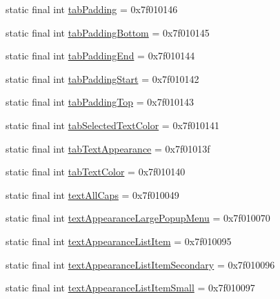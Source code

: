 \begin{CompactItemize}
static final int \hyperlink{classandroid_1_1support_1_1graphics_1_1drawable_1_1_r_1_1attr_b090fa56e3aa97223f82dd1d9bc88b09}{tabPadding} = 0x7f010146
\item 
static final int \hyperlink{classandroid_1_1support_1_1graphics_1_1drawable_1_1_r_1_1attr_11d23bd1271346ec959016307c0eb4e8}{tabPaddingBottom} = 0x7f010145
\item 
static final int \hyperlink{classandroid_1_1support_1_1graphics_1_1drawable_1_1_r_1_1attr_253a76b0998736685826b3d7fd90af44}{tabPaddingEnd} = 0x7f010144
\item 
static final int \hyperlink{classandroid_1_1support_1_1graphics_1_1drawable_1_1_r_1_1attr_38b04f93c4574faab9907e58d54379f6}{tabPaddingStart} = 0x7f010142
\item 
static final int \hyperlink{classandroid_1_1support_1_1graphics_1_1drawable_1_1_r_1_1attr_848f0f790a22eb9d114525981326c7cb}{tabPaddingTop} = 0x7f010143
\item 
static final int \hyperlink{classandroid_1_1support_1_1graphics_1_1drawable_1_1_r_1_1attr_baa9a876b28599cd8844d65e13a499f4}{tabSelectedTextColor} = 0x7f010141
\item 
static final int \hyperlink{classandroid_1_1support_1_1graphics_1_1drawable_1_1_r_1_1attr_bf138a6eb2a9141e79a42c48b279febc}{tabTextAppearance} = 0x7f01013f
\item 
static final int \hyperlink{classandroid_1_1support_1_1graphics_1_1drawable_1_1_r_1_1attr_a185f4a966938ffbfed8d23a65c412ba}{tabTextColor} = 0x7f010140
\item 
static final int \hyperlink{classandroid_1_1support_1_1graphics_1_1drawable_1_1_r_1_1attr_36a7d71fd8e60a097e4409fb0d99b5ae}{textAllCaps} = 0x7f010049
\item 
static final int \hyperlink{classandroid_1_1support_1_1graphics_1_1drawable_1_1_r_1_1attr_edbd591c4879cc5d9c1eb50e3069328c}{textAppearanceLargePopupMenu} = 0x7f010070
\item 
static final int \hyperlink{classandroid_1_1support_1_1graphics_1_1drawable_1_1_r_1_1attr_8dbb7fcd5c1f30239956484df1d88d11}{textAppearanceListItem} = 0x7f010095
\item 
static final int \hyperlink{classandroid_1_1support_1_1graphics_1_1drawable_1_1_r_1_1attr_f77248764802565f6d9ee3355f613330}{textAppearanceListItemSecondary} = 0x7f010096
\item 
static final int \hyperlink{classandroid_1_1support_1_1graphics_1_1drawable_1_1_r_1_1attr_818fb88cd64d4f9501d4f3520136640e}{textAppearanceListItemSmall} = 0x7f010097

\end{CompactItemize}
